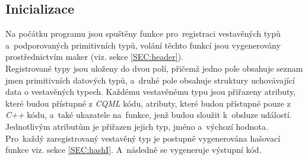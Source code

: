 \documentclass[11pt,twoside,a4paper]{book}
\begin{document}
\subsection{Inicializace}
Na počátku programu jsou spuštěny funkce pro~registraci vestavěných typů a~podporovaných primitivních typů, volání těchto funkcí jsou vygenerovány prostřednictvím maker (viz. sekce \ref{SEC:header}).\\
Registrované typy jsou uloženy do dvou polí, přičemž jedno pole obsahuje seznam jmen primitivních datových typů, a~druhé pole obsahuje struktury uchovávající data o vestavěných typech. Každému vestavěnému typu jsou přiřazeny atributy, které budou přístupné z \textit{CQML} kódu, atributy, které budou přístupné pouze z \textit{C++} kódu, a~také ukazatele na~funkce, jenž budou sloužit k~obsluze událostí. Jednotlivým atributům je přiřazen jejich typ, jméno a~výchozí hodnota. Pro~každý zaregistrovaný vestavěný typ je postupně vygenerována hašovací funkce viz. sekce \ref{SEC:hashI}. A~následně se vygeneruje výstupní kód.\\
\end{document}
